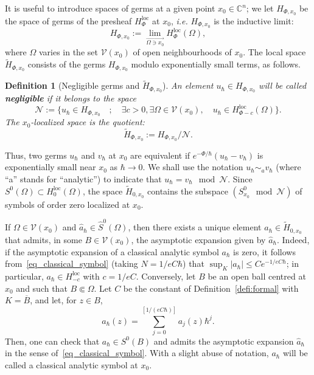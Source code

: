 \documentclass{article}
\newtheorem{defi}[theo]{Definition}
\newcommand{\loc}{\mathrm{loc}}
\newcommand{\abs}[1]{\left|#1\right|}
\newcommand{\CM}{\mathbb{C}}
\newcommand{\h}{\hbar}
\newcommand{\N}{\mathcal{N}}
\begin{document}
It is useful to introduce spaces of germs at a given point
$x_0\in \CM^n$; we let $H_{\Phi,x_0}$ be the space of germs of the
presheaf $H^{\loc}_{ \Phi}$ at $x_0$, \emph{i.e.}  $H_{\Phi,x_0}$ is
the inductive limit:
\[
H_{\Phi,x_0} := \lim_{\overrightarrow{\Omega\ni x_0}} H^{\loc}_{
  \Phi}(\Omega),
\]
where $\Omega$ varies in the set $\mathcal{V}(x_0)$ of open
neighbourhoods of $x_0$.  The local space $\widetilde H_{\Phi,x_0}$
consists of the germs $H_{\Phi,x_0}$ modulo exponentially small terms,
as follows.
\begin{defi}[Negligible germs and $\widetilde H_{\Phi,x_0}$]
  \label{defi:negligible-germ}
  An element $u_\h\in H_{ \Phi,x_0}$ will be called
  \textbf{negligible} if it belongs to the space
  \[
  \N := \{ u_\h \in H_{ \Phi, x_0} \quad ; \quad \exists c>0, \exists
  \Omega\in \mathcal{V}(x_0), \quad u_\h\in
  H_{\Phi-c}^{\loc}(\Omega)\}.
  \]
  The {$x_0$-localized space} is the quotient:
  \[
  \widetilde H_{\Phi,x_0} := H_{\Phi,x_0} / \N.
  \]
\end{defi}
Thus, two germs $u_\h$ and $v_\h$ at $x_0$ are equivalent if
$e^{-\Phi/\h}(u_\h-v_\h)$ is exponentially small near $x_0$ as
$\h\to 0$. We shall use the notation $u_\h \sim_a v_\h$ (where ``a''
stands for ``analytic'') to indicate that $u_\h = v_\h \mod \N$. Since
$S^0(\Omega)\subset H_{0}^{\loc}(\Omega)$, the space
$\widetilde H_{0,x_0}$ contains the subspace $(S^0_{x_0} \mod \N)$ of
symbols of order zero localized at $x_0$.

If $\Omega\in \mathcal{V}(x_0)$ and $\hat a_\h\in \hat S^0(\Omega)$,
then there exists a unique element $a_\h \in \widetilde H_{0,x_0}$
that admits, in some $B\in \mathcal{V}(x_0)$, the asymptotic expansion
given by $\hat a_\h$. Indeed, if the asymptotic expansion of a
classical analytic symbol $a_\h$ is zero, it follows
from~\eqref{eq_classical_symbol} (taking $N=1/e C\h$) that
$\sup_K\abs{a_\h}\leq Ce^{-1/e C\h}$; in particular,
$a_\h \in H_{-c}^{\loc}$ with $c = 1/eC$. Conversely, let $B$ be an
open ball centred at $x_0$ and such that $B\Subset\Omega$. Let $C$ be
the constant of Definition~\ref{defi:formal} with $K=\overline{B}$,
and let, for $z\in B$,
\[
a_\h(z) = \sum_{j=0}^{[1/ (e C \hbar)]} a_j(z) \hbar^j.
\]
Then, one can check that $a_\h\in S^0(B)$ and admits the asymptotic
expansion $\hat a_\h$ in the sense of~\eqref{eq_classical_symbol}.
With a slight abuse of notation, $a_\h$ will be called a classical
analytic symbol at $x_0$.
\end{document}
